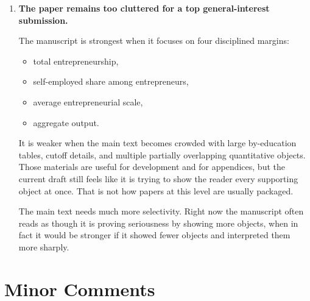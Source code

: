 \documentclass[11pt]{article}
\begin{document}
\begin{enumerate}[leftmargin=*,label=\textbf{\arabic*.}]
Most importantly, the paper itself notes that a simple productivity MIT shock is
not the right object. That is correct. But the replacement recession exercise
also remains problematic, because the labor-market tightness response is not
cleanly recession-like, and the transition interpretation still appears to rely
on a partially ad hoc mapping from separation risk to recession conditions.

In other words, the current recession section does not yet read like a decisive
quantitative result. It reads like an extension that is still under
construction. For this reason, I would either sharply narrow the claim or remove
the section from the main text until the recession mapping is much more
convincing.

\item \textbf{The paper remains too cluttered for a top general-interest
submission.}

The manuscript is strongest when it focuses on four disciplined margins:

\begin{itemize}[leftmargin=*]
\item total entrepreneurship,
\item self-employed share among entrepreneurs,
\item average entrepreneurial scale,
\item aggregate output.
\end{itemize}

It is weaker when the main text becomes crowded with large by-education tables,
cutoff details, and multiple partially overlapping quantitative objects. Those
materials are useful for development and for appendices, but the current draft
still feels like it is trying to show the reader every supporting object at
once. That is not how papers at this level are usually packaged.

The main text needs much more selectivity. Right now the manuscript often reads
as though it is proving seriousness by showing more objects, when in fact it
would be stronger if it showed fewer objects and interpreted them more sharply.
\end{enumerate}

\section*{Minor Comments}
\end{document}
